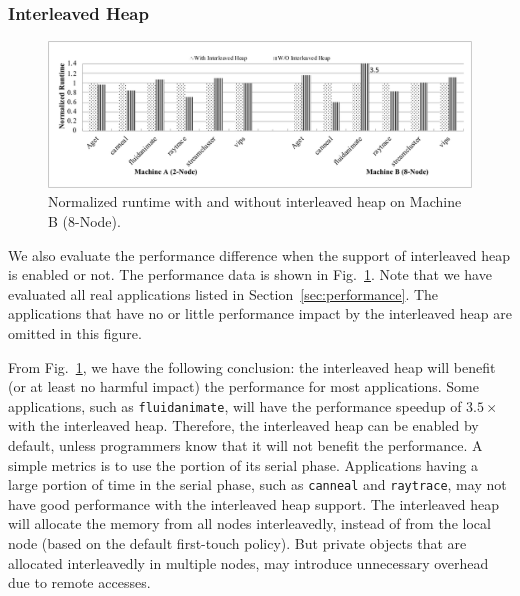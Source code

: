 \subsubsection{Interleaved Heap} 
\label{sec:interleavedheap}

\begin{figure}[H]
    \centering
    \includegraphics[width=\textwidth]{figure/interleavedheap.pdf}
    \caption{Normalized runtime with  and without interleaved heap on Machine B (8-Node).\label{fig:interleavedheap}}  
\end{figure}

We also evaluate the performance difference when the support of interleaved heap is enabled or not. The performance data is shown in Fig.~\ref{fig:interleavedheap}. Note that we have evaluated all real applications listed in Section~\ref{sec:performance}. The applications that have no or little performance impact by the interleaved heap are omitted in this figure. 

From Fig.~\ref{fig:interleavedheap}, we have the following conclusion: the interleaved heap will benefit (or at least no harmful impact) the performance for most applications. Some applications, such as \texttt{fluidanimate}, will have the performance speedup of $3.5\times$ with the interleaved heap. Therefore, the interleaved heap can be enabled by default, unless programmers know that it will not benefit the performance. A simple metrics is to use the portion of its serial phase. Applications having a large portion of time in the serial phase, such as \texttt{canneal} and \texttt{raytrace}, may not have good performance with the interleaved heap support. The interleaved heap will allocate the memory from all nodes interleavedly, instead of from the local node (based on the default first-touch policy). But private objects that are allocated interleavedly in multiple nodes, may introduce unnecessary overhead due to remote accesses. 


